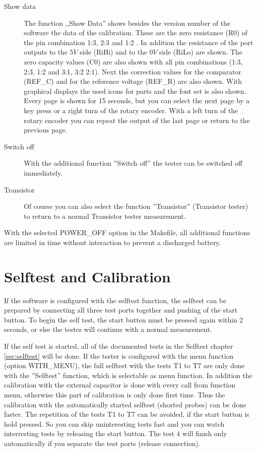 \begin{description}
 \item[Show data]
The function ,,Show Data'' shows besides the version number of the software the data of the calibration.
These are the zero resistance (R0) of the pin combination 1:3, 2:3 and 1:2 .
In addition the resistance of the port outputs to the \(5V\) side (RiHi) and
to the \(0V\) side (RiLo) are shown.
The zero capacity values (C0) are also shown with all pin combinations (1:3, 2:3, 1:2 and 3:1, 3:2 2:1).
Next the correction values for the comparator (REF\_C) and for the reference voltage (REF\_R) are also shown.
With graphical displays the used icons for parts and the font set is also shown.
Every page is shown for 15 seconds, but you can select the next page by a key press or a right turn of the rotary encoder.
With a left turn of the rotary encoder you can repeat the output of the last page or return to the previous page.


\item[Switch off]
With the additional function ''Switch off'' the tester can be switched off immediately.\\

\item[Transistor]
Of course you can also select the function ''Transistor'' (Transistor tester) to return to a normal Transistor tester measurement. 
\end{description}

With the selected POWER\_OFF option in the Makefile, all additional functions are limited in time without interaction to prevent a discharged battery.


\section{Selftest and Calibration}

If the software is configured with the selftest function, the selftest can be prepared by connecting all three
test ports together and pushing of the start button.
To begin the self test, the start butten must be pressed again within 2 seconds, or else the tester will continue
with a normal measurement.

If the self test is started, all of the documented tests in the Selftest chapter \ref{sec:selftest} will be done.
If the tester is configured with the menu function (option WITH\_MENU), 
the full selftest with the tests T1 to T7 are only done with the ''Selftest'' function, 
which is selectable as menu function.
In addition the calibration with the external capacitor is done with every call from function menu,
otherwise this part of calibration is only done first time.
Thus the calibration with the automatically started selftest (shorted probes) can be done faster.
The repetition of the tests T1 to T7 can be avoided, if the start button is hold pressed.
So you can skip uninteresting tests fast and you can watch interresting tests by releasing the start button.
The test 4 will finish only automatically if you separate the test ports (release connection).

